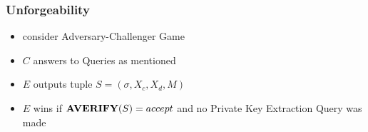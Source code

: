 \begin{frame}
	\frametitle{Unforgeability}

	\begin{itemize}[<+->]
		\setlength\itemsep{1em}
		\item consider Adversary-Challenger Game
		\item $C$ answers to Queries as mentioned
		\item $E$ outputs tuple $S = (\sigma, X_c, X_d, M)$ 
		\item $E$ wins if $\textbf{AVERIFY}(S) = accept$ and no Private Key Extraction Query was made
		\end{itemize}
\end{frame}